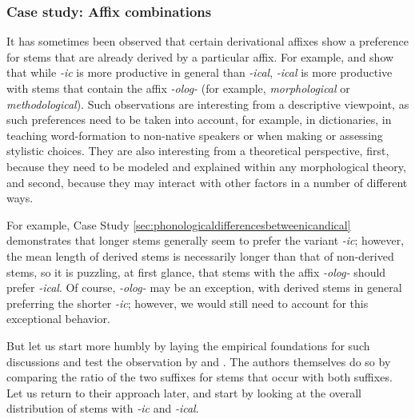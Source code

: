 \subsubsection{Case study: Affix combinations}
\label{sec:affixcombinations}

It has sometimes been observed that certain derivational affixes  show a preference for stems that are already derived by a particular affix.  For example, \citet{lindsay_rival_2011} and \citet{lindsay_natural_2013} show that while \textit{-ic} is more productive  in general than \textit{-ical}, \textit{-ical} is more productive with stems that contain the affix  \textit{-olog-} (for example, \textit{morphological} or \textit{methodological}). Such observations are interesting from a descriptive viewpoint, as such preferences need to be taken into account, for example, in dictionaries,  in teaching word\hyp{}formation to non\hyp{}native speakers or when making or assessing stylistic  choices. They are also interesting from a theoretical perspective, first, because they need to be modeled and explained  within any morphological  theory, and second, because they may interact with other factors in a number of different ways.

For example, Case Study \ref{sec:phonologicaldifferencesbetweenicandical} demonstrates that longer stems  generally seem to prefer the variant \textit{-ic}; however, the mean  length  of derived stems is necessarily longer than that of non\hyp{}derived stems,  so it is puzzling, at first glance, that stems with the affix  \textit{-olog-} should prefer \textit{-ical}. Of course, \textit{-olog-} may be an exception, with derived stems in general preferring the shorter \textit{-ic}; however, we would still need to account for this exceptional behavior.

But let us start more humbly by laying the empirical foundations for such discussions and test the observation by \citet{lindsay_rival_2011} and \citet{lindsay_natural_2013}. The authors themselves do so by comparing the ratio of the two suffixes  for stems that occur with both suffixes. Let us return to their approach later, and start by looking at the overall distribution  of stems  with \textit{-ic} and \textit{-ical}.

